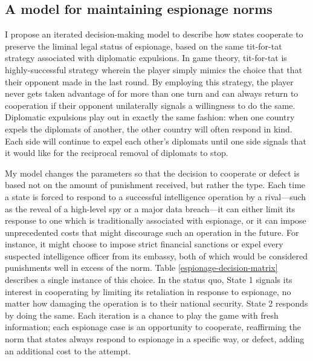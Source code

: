 \documentclass[14pt]{extarticle}
\begin{document}
\subsection{A model for maintaining espionage norms}
I propose an iterated decision-making model to describe how states cooperate to preserve the liminal legal status of espionage, based on the same tit-for-tat strategy associated with diplomatic expulsions. In game theory, tit-for-tat is highly-successful strategy wherein the player simply mimics the choice that that their opponent made in the last round. By employing this strategy, the player never gets taken advantage of for more than one turn and can always return to cooperation if their opponent unilaterally signals a willingness to do the same. Diplomatic expulsions play out in exactly the same fashion: when one country expels the diplomats of another, the other country will often respond in kind. Each side will continue to expel each other's diplomats until one side signals that it would like for the reciprocal removal of diplomats to stop.


My model changes the parameters so that the decision to cooperate or defect is based not on the amount of punishment received, but rather the type. Each time a state is forced to respond to a successful intelligence operation by a rival---such as the reveal of a high-level spy or a major data breach---it can either limit its response to one which is traditionally associated with espionage, or it can impose unprecedented costs that might discourage such an operation in the future. For instance, it might choose to impose strict financial sanctions or expel every suspected intelligence officer from its embassy, both of which would be considered punishments well in excess of the norm. Table \ref{espionage-decision-matrix} describes a single instance of this choice. In the status quo, State 1 signals its interest in cooperating by limiting its retaliation in response to espionage, no matter how damaging the operation is to their national security. State 2 responds by doing the same. Each iteration is a chance to play the game with fresh information; each espionage case is an opportunity to cooperate, reaffirming the norm that states always respond to espionage in a specific way, or defect, adding an additional cost to the attempt.
\end{document}
